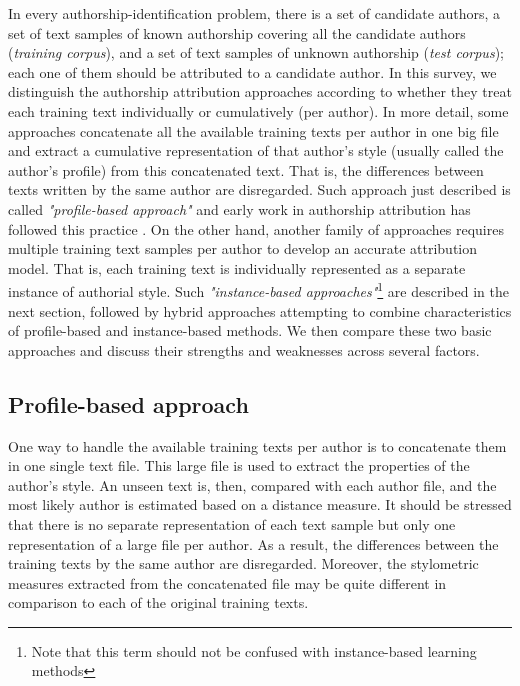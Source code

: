 In every authorship-identification problem, there is a set of candidate authors, a set of text samples of known authorship covering all the candidate authors (\textit{training corpus}), and a set of text samples of unknown authorship (\textit{test corpus}); each
one of them should be attributed to a candidate author. In this survey, we distinguish the authorship attribution approaches according to whether they treat each training text individually or cumulatively (per author). In more detail, some approaches concatenate all the available training texts per author in one big file and extract a cumulative representation of that author’s style (usually called the author’s profile) from
this concatenated text. That is, the differences between texts
written by the same author are disregarded. Such approach just described is called \textit{"profile-based approach"} and early work in authorship attribution has followed this practice \cite{mosteller2007inference}.
On the other hand, another family of approaches requires multiple training text samples per author to develop an accurate attribution model. That is, each training text is
individually represented as a separate instance of authorial style. Such \textit{"instance-based approaches"}\footnote{Note that this term should not be confused with instance-based learning methods\cite{mitchell1997artificial}} are described in the
next section, followed by hybrid approaches attempting to combine characteristics of profile-based and instance-based methods. We then compare these two basic approaches and
discuss their strengths and weaknesses across several factors.

\subsection{Profile-based approach}

One way to handle the available training texts per author is to concatenate them in one single text file. This large file is used to extract the properties of the author’s style. An unseen text is, then, compared with each author file, and the most likely author is estimated based on a distance measure. It should be stressed that there is no separate representation of each text sample but only one representation of a large file per author. As a result, the differences between the training texts by the same author are disregarded. Moreover, the stylometric measures extracted from the concatenated file may be quite
different in comparison to each of the original training texts.

